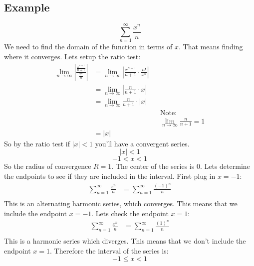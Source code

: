 \documentclass{article}
\begin{document}
    \subsection{Example}
        \[\sum_{n=1}^{\infty}  \frac{x^n}{n}\]
        We need to find the domain of the function in terms of \(x\).
        That means finding where it converges.
        Lets setup the ratio test:
        \begin{align*}
            \lim_{n \to \infty} \left| \frac{\frac{x^{n+1}}{n+1}}{\frac{x^n}{n}}\right|
            &= \lim_{n \to \infty} \left| \frac{x^{n+1}}{n+1} \cdot \frac{n!}{x^n}\right| \\
            &= \lim_{n \to \infty} \left| \frac{n}{n+1} \cdot x\right| \\
            &= \lim_{n \to \infty} \frac{n}{n+1} \cdot |x| \\
            && &\text{Note:} \\
            && &\lim_{n \to \infty} \frac{n}{n+1} = 1 \\
            &= |x|
        \end{align*}
        So by the ratio test if \(|x| < 1\) you'll have a convergent series.
        \[|x| < 1\]
        \[-1 < x < 1\]
        So the radius of convergence \(R = 1\).
        The center of the series is \(0\).
        Lets determine the endpoints to see if they are included in the interval.
        First plug in \(x = -1\):
        \begin{align*}
            \sum_{n=1}^{\infty}  \frac{x^n}{n} 
            &= \sum_{n=1}^{\infty}  \frac{(-1)^n}{n} \\
        \end{align*}
        This is an alternating harmonic series, which converges.
        This means that we include the endpoint \(x = -1\).
        Lets check the endpoint \(x = 1\):
        \begin{align*}
            \sum_{n=1}^{\infty}  \frac{x^n}{n} 
            &= \sum_{n=1}^{\infty}  \frac{(1)^n}{n} \\
        \end{align*} 
        This is a harmonic series which diverges.
        This means that we don't include the endpoint \(x = 1\).
        Therefore the interval of the series is:
        \[-1 \leq x < 1\]
    
\end{document}
